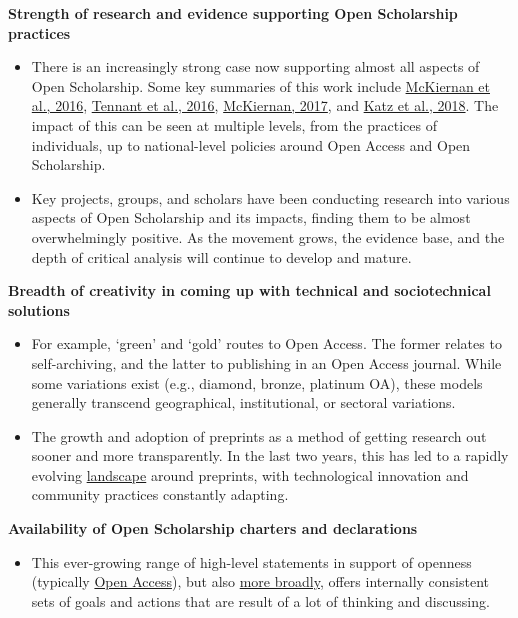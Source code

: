 \textbf{Strength of research and evidence supporting Open Scholarship
practices}

\begin{itemize}
\item
  There is an increasingly strong case now supporting almost all aspects
  of Open Scholarship. Some key summaries of this work include
  \href{https://doi.org/10.7554/eLife.16800}{McKiernan et al., 2016},
  \href{https://doi.org/10.12688/f1000research.8460.3}{Tennant et al.,
  2016}, \href{https://doi.org/10.1371/journal.pbio.1002614}{McKiernan,
  2017}, and \href{https://doi.org/10.12688/f1000research.17425.1}{Katz
  et al., 2018}. The impact of this can be seen at multiple levels, from
  the practices of individuals, up to national-level policies around
  Open Access and Open Scholarship.
\item
  Key projects, groups, and scholars have been conducting research into
  various aspects of Open Scholarship and its impacts, finding them to
  be almost overwhelmingly positive. As the movement grows, the evidence
  base, and the depth of critical analysis will continue to develop and
  mature.
\end{itemize}

\textbf{Breadth of creativity in coming up with technical and
sociotechnical solutions}

\begin{itemize}
\item
  For example, `green' and `gold' routes to Open Access. The former
  relates to self-archiving, and the latter to publishing in an Open
  Access journal. While some variations exist (e.g., diamond, bronze,
  platinum OA), these models generally transcend geographical,
  institutional, or sectoral variations.
\item
  The growth and adoption of preprints as a method of getting research
  out sooner and more transparently. In the last two years, this has led
  to a rapidly evolving
  \href{https://doi.org/10.31222/osf.io/796tu}{landscape} around
  preprints, with technological innovation and community practices
  constantly adapting.
\end{itemize}

\textbf{Availability of Open Scholarship charters and declarations}

\begin{itemize}
\tightlist
\item
  This ever-growing range of high-level statements in support of
  openness (typically
  \href{http://oad.simmons.edu/oadwiki/Declarations_in_support_of_OA}{Open
  Access}), but also \href{http://tinyurl.com/scholcomm-charters}{more
  broadly}, offers internally consistent sets of goals and actions that
  are result of a lot of thinking and discussing.
\end{itemize}

